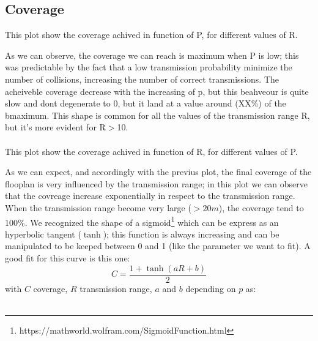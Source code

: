 \subsection{Coverage}
This plot show the coverage achived in function of P, for different values of R.
\begin{figure}[H]
    \begin{center}
    \end{center}
    \vspace*{-1cm}
\end{figure}
As we can observe, the coverage we can reach is maximum when P is low; this was predictable by the fact that a low transmission
probability minimize the number of collisions, increasing the number of correct transmissions. 
The acheiveble coverage decrease with the increasing of p, but this beahveour is quite slow and
dont degenerate to 0, but it land at a value around (XX\%) of the bmaximum. %
This shape is common for all the values of the transmission range R, but it's more evident for R$>$10.\\\\
This plot show the coverage achived in function of R, for different values of P.
\begin{figure}[H]
    \begin{center}
    \end{center}
    \vspace*{-1cm}
\end{figure}
As we can expect, and accordingly with the previus plot, the final coverage of the flooplan is very
influenced by the transmission range; in this plot we can observe that the covreage increase exponentially
in respect to the transmission range. When the transmission range become very large ($>20m$),
the coverage tend to 100\%. We recognized the shape of a sigmoid\footnote{https://mathworld.wolfram.com/SigmoidFunction.html} 
which can be express as an hyperbolic tangent ($ \tanh $); this function is always increasing and can be manipulated
to be keeped between 0 and 1 (like the parameter we want to fit). A good fit for this curve is this one:\\
\begin{equation*}
    C =  \frac{1+\tanh(aR+b)}{2} 
\end{equation*} 
with $C$ coverage, $R$ transmission range, $a$ and $b$ depending on $p$ as:\\
\\
